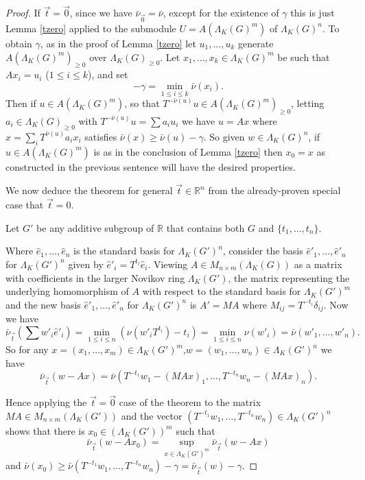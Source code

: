 \documentclass{amsart}
\theoremstyle{plain}
\theoremstyle{definition}
\theoremstyle{remark}
\def\barnu{\bar{\nu}}
\begin{document}
\begin{proof} If $\vec{t}=\vec{0}$, since we have $\barnu_{\vec{0}}=\barnu$, except for the existence of $\gamma$ this is just Lemma \ref{tzero} applied to the submodule $U=A(\Lambda_K(G)^m)$ of $\Lambda_K(G)^n$.  To obtain $\gamma$, as in the proof of Lemma \ref{tzero} let $u_1,\ldots,u_k$ generate $A(\Lambda_K(G)^m)_{\geq 0}$ over $\Lambda_K(G)_{\geq 0}$.  Let $x_1,\ldots,x_k\in \Lambda_K(G)^m$ be such that $Ax_i=u_i$ ($1\leq i\leq k$), and set 
\[ -\gamma=\min_{1\leq i\leq k}\barnu(x_i).\]  Then if $u\in A(\Lambda_K(G)^m)$, so that $T^{-\barnu(u)}u\in A(\Lambda_K(G)^m)_{\geq 0}$, letting $a_i\in \Lambda_K(G)_{\geq 0}$ with $T^{-\barnu(u)}u=\sum a_iu_i$ we have $u=Ax$ where $x=\sum_{i}T^{\barnu(u)}a_ix_i$ satisfies $\barnu(x)\geq \barnu(u)-\gamma$.  So given $w\in \Lambda_K(G)^n$, if $u\in A(\Lambda_K(G)^m)$ is as in the conclusion of Lemma \ref{tzero} then $x_0=x$ as constructed in the previous sentence will have the desired properties.

We now deduce the theorem for general $\vec{t}\in\mathbb{R}^n$ from the already-proven special case that $\vec{t}=0$.

Let $G'$ be any additive subgroup of $\mathbb{R}$ that contains both $G$ and $\{t_1,\ldots,t_n\}$.

Where $\hat{e}_1,\ldots,\hat{e}_n$ is the standard basis for $\Lambda_K(G')^n$, consider the basis $\hat{e}'_1,\ldots,\hat{e}'_n$ for $\Lambda_K(G')^n$ given by $\hat{e}'_i=T^{t_i}\hat{e}_i$.  Viewing $A\in M_{n\times m}(\Lambda_K(G))$ as a matrix with coefficients in the larger Novikov ring $\Lambda_K(G')$, the matrix representing the underlying homomorphism of $A$ with respect to the standard basis for $\Lambda_K(G')^m$ and the new basis $\hat{e}'_1,\ldots,\hat{e}'_n$ for $\Lambda_K(G')^n$ is $A'=MA$ where $M_{ij}=T^{-t_i}\delta_{ij}$.   Now  we have \[ \barnu_{\vec{t}}(\sum w'_i\hat{e}'_i)=\min_{1\leq i\leq n}(\nu(w'_iT^{t_i})-t_i)=\min_{1\leq i\leq n}\nu(w'_i)=\barnu(w'_1,\ldots,w'_n).\]  So for any $x=(x_1,\ldots,x_m)\in \Lambda_K(G')^m$,$w=(w_1,\dots,w_n)\in\Lambda_K(G')^n$ we have \[ \barnu_{\vec{t}}\left(w-Ax\right)=\barnu\left(T^{-t_1}w_1-(MAx)_1,\ldots,T^{-t_n}w_n-(MAx)_n\right).\]

Hence applying the $\vec{t}=\vec{0}$ case of the theorem  to the matrix $MA\in M_{n\times m}(\Lambda_K(G'))$ and the vector $(T^{-t_1}w_1,\ldots,T^{-t_n}w_n)\in \Lambda_K(G')^n$  shows that there is $x_0\in (\Lambda_K(G'))^m$ such that \[ \barnu_{\vec{t}}(w-Ax_0)=\sup_{x\in \Lambda_K(G')^m}\barnu_{\vec{t}}(w-Ax)\]
and $\barnu(x_0)\geq \barnu(T^{-t_1}w_1,\ldots,T^{-t_n}w_n)-\gamma=\barnu_{\vec{t}}(w)-\gamma$.


\end{proof}
\end{document}
